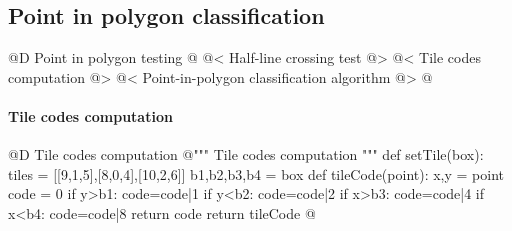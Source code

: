 \documentclass[11pt,oneside]{article}    %
\begin{document}
\subsection{Point in polygon classification}

@D Point in polygon testing
@{
@< Half-line crossing test @>
@< Tile codes computation @>
@< Point-in-polygon classification algorithm @>
@}

\paragraph{Tile codes computation}
@D Tile codes computation
@{""" Tile codes computation """
def setTile(box):
    tiles = [[9,1,5],[8,0,4],[10,2,6]]
    b1,b2,b3,b4 = box
    def tileCode(point):
        x,y = point
        code = 0
        if y>b1: code=code|1
        if y<b2: code=code|2
        if x>b3: code=code|4
        if x<b4: code=code|8
        return code 
    return tileCode
@}
\end{document}
